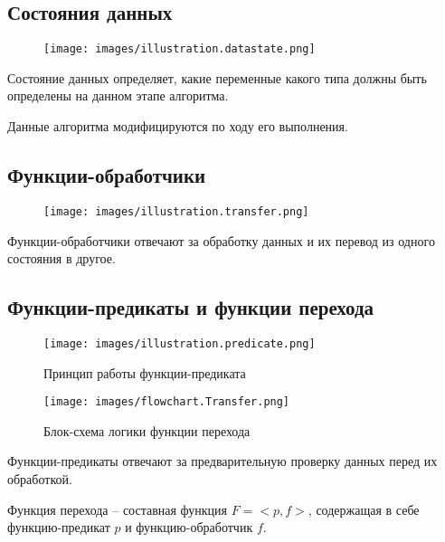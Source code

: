 ﻿%
\subsection{Состояния данных}
\begin{frame}
	\begin{figure}
		\centering
		\texttt{[image: images/illustration.datastate.png]}
	\end{figure}
	Состояние данных определяет, какие переменные какого типа должны быть определены на данном этапе алгоритма.

	Данные алгоритма модифицируются по ходу его выполнения.
\end{frame}

\subsection{Функции-обработчики}
\begin{frame}
	\begin{figure}
		\centering
		\texttt{[image: images/illustration.transfer.png]}
	\end{figure}

	Функции-обработчики отвечают за обработку данных и их перевод из одного состояния в другое.
\end{frame}


\subsection{Функции-предикаты и функции перехода}
\begin{frame}
	\begin{figure}
		\begin{minipage}{0.49\textwidth}
			\centering
			\texttt{[image: images/illustration.predicate.png]}
			\caption{Принцип работы функции-предиката}
		\end{minipage}\hfill\begin{minipage}{0.49\textwidth}
			\centering
			\texttt{[image: images/flowchart.Transfer.png]}
			\caption{Блок-схема логики функции перехода}
		\end{minipage}\hfill
	\end{figure}

	Функции-предикаты отвечают за предварительную проверку данных перед их обработкой.

	Функция перехода -- составная функция $F=<p,f>$, содержащая в себе функцию-предикат $p$ и функцию-обработчик $f$.
\end{frame}

